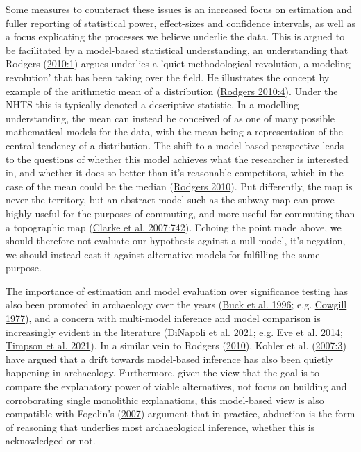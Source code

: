 \documentclass[
  a4paper,
  oneside]{uiophdthesis}
\begin{document}
Some measures to counteract these issues is an increased focus on estimation and fuller reporting of statistical power, effect-sizes and confidence intervals, as well as a focus explicating the processes we believe underlie the data. This is argued to be facilitated by a model-based statistical understanding, an understanding that Rodgers (\protect\hyperlink{ref-rodgers2010}{2010:1}) argues underlies a 'quiet methodological revolution, a modeling revolution' that has been taking over the field. He illustrates the concept by example of the arithmetic mean of a distribution (\protect\hyperlink{ref-rodgers2010}{Rodgers 2010:4}). Under the NHTS this is typically denoted a descriptive statistic. In a modelling understanding, the mean can instead be conceived of as one of many possible mathematical models for the data, with the mean being a representation of the central tendency of a distribution. The shift to a model-based perspective leads to the questions of whether this model achieves what the researcher is interested in, and whether it does so better than it's reasonable competitors, which in the case of the mean could be the median (\protect\hyperlink{ref-rodgers2010}{Rodgers 2010}). Put differently, the map is never the territory, but an abstract model such as the subway map can prove highly useful for the purposes of commuting, and more useful for commuting than a topographic map (\protect\hyperlink{ref-clarke2007}{Clarke et al. 2007:742}). Echoing the point made above, we should therefore not evaluate our hypothesis against a null model, it's negation, we should instead cast it against alternative models for fulfilling the same purpose.

The importance of estimation and model evaluation over significance testing has also been promoted in archaeology over the years (\protect\hyperlink{ref-buck1996}{Buck et al. 1996}; e.g. \protect\hyperlink{ref-cowgill1977}{Cowgill 1977}), and a concern with multi-model inference and model comparison is increasingly evident in the literature (\protect\hyperlink{ref-dinapoli2021}{DiNapoli et al. 2021}; e.g. \protect\hyperlink{ref-eve2014}{Eve et al. 2014}; \protect\hyperlink{ref-timpson2021}{Timpson et al. 2021}). In a similar vein to Rodgers (\protect\hyperlink{ref-rodgers2010}{2010}), Kohler et al. (\protect\hyperlink{ref-kohler2007}{2007:3}) have argued that a drift towards model-based inference has also been quietly happening in archaeology. Furthermore, given the view that the goal is to compare the explanatory power of viable alternatives, not focus on building and corroborating single monolithic explanations, this model-based view is also compatible with Fogelin's (\protect\hyperlink{ref-fogelin2007}{2007}) argument that in practice, abduction is the form of reasoning that underlies most archaeological inference, whether this is acknowledged or not.
\end{document}

